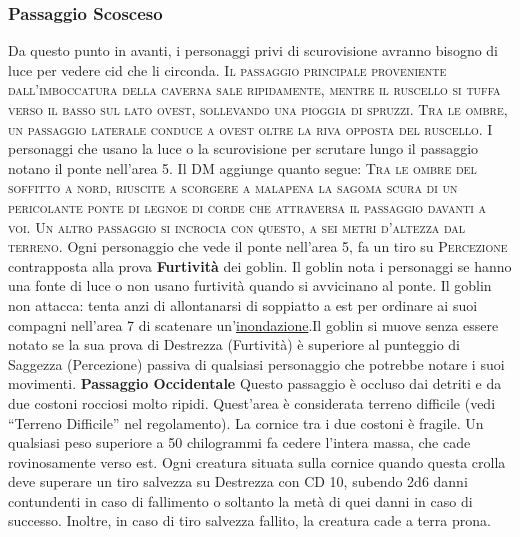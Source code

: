 \documentclass{article}
\begin{document}
\subsubsection{Passaggio Scosceso}
Da questo punto in avanti, i personaggi privi di scurovisione
avranno bisogno di luce per vedere cid che li circonda. \textsc{Il passaggio principale proveniente dall’imboccatura della
caverna sale ripidamente, mentre il ruscello si tuffa verso il
basso sul lato ovest, sollevando una pioggia di spruzzi. Tra
le ombre, un passaggio laterale conduce a ovest oltre la riva
opposta del ruscello.}\newline
I personaggi che usano la luce o la scurovisione per scrutare
lungo il passaggio notano il ponte nell’area 5. Il DM aggiunge
quanto segue: \textsc{Tra le ombre del soffitto a nord, riuscite a scorgere a malapena
la sagoma scura di un pericolante ponte di legnoe di corde
che attraversa il passaggio davanti a voi. Un altro passaggio si
incrocia con questo, a sei metri d’altezza dal terreno.}
Ogni personaggio che vede il ponte nell'area 5, fa un tiro su \textsc{Percezione} contrapposta alla prova \textbf{Furtività} dei goblin.
Il goblin nota i personaggi se hanno una fonte di luce o
non usano furtività quando si avvicinano al ponte. Il goblin
non attacca: tenta anzi di allontanarsi di soppiatto a est
per ordinare ai suoi compagni nell’area 7 di scatenare
un’\hyperlink{inondazione}{inondazione}.Il goblin si muove senza essere notato se la sua prova di
Destrezza (Furtività) è superiore al punteggio di Saggezza
(Percezione) passiva di qualsiasi personaggio che potrebbe
notare i suoi movimenti.\newline
\textbf{Passaggio Occidentale} Questo passaggio è occluso dai
detriti e da due costoni rocciosi molto ripidi. Quest'area
è considerata terreno difficile (vedi “Terreno Difficile” nel
regolamento).
La cornice tra i due costoni è fragile. Un qualsiasi peso
superiore a 50 chilogrammi fa cedere l’intera massa, che
cade rovinosamente verso est. Ogni creatura situata sulla
cornice quando questa crolla deve superare un tiro salvezza
su Destrezza con CD 10, subendo 2d6 danni contundenti in
caso di fallimento o soltanto la metà di quei danni in caso di
successo. Inoltre, in caso di tiro salvezza fallito, la creatura
cade a terra prona.
\end{document}

